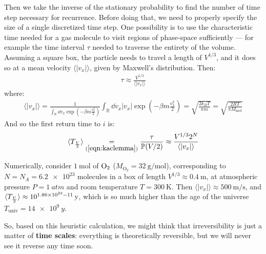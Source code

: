 \documentclass[../../main.tex]{subfiles}
\begin{document}
\medskip

Then we take the inverse of the stationary probability to find the number of time step necessary for recurrence. Before doing that, we need to properly specify the size of a single discretized time step. One possibility is to use the characteristic time needed for a gas molecule to visit regions of phase-space sufficiently  --- for example the time interval $\tau$ needed to traverse the entirety of the volume. Assuming a square box, the particle needs to travel a length of $V^{1/3}$, and it does so at a mean velocity $\langle |v_x| \rangle$, given by Maxwell's distribution. Then:
\begin{align*}
    \tau \approx \frac{V^{1/3}}{\langle |v_x| \rangle} 
\end{align*}
where:
\begin{align*}
    \langle |v_x| \rangle = \frac{1}{{\int_{\mathbb{R}} \dd{v_x} \exp\left(-\beta m \frac{v_x^2}{2} \right)}}  \int_{\mathbb{R}} \dd{v_x} |v_x| {\exp(-\beta m \frac{v_x^2}{2} )} = \sqrt{\frac{2 k_B T}{\pi m}} = \sqrt{\frac{2 R T}{\pi M_{\mathrm{mol}}} }
\end{align*}
And so the first return time to $i$ is:
\begin{align*}
    \langle T_{\frac{V}{2}} \rangle \underset{(\ref{eqn:kaclemma})}{=} \frac{\tau}{\mathbb{P}(V/2)} \approx \frac{V^{1/3} 2^N}{\langle |v_x| \rangle} 
\end{align*}

Numerically, consider $\SI{1}{\mol}$ of $\rm{O}_2$ ($M_{\mathrm{O}_2} = \SI{32}{\g\per\mol}$), corresponding to $N=N_A = \num{6.2e23}$ molecules in a box of length $V^{1/3} \approx \SI{0.4}{\m}$, at atmospheric pressure $P=\SI{1}{atm}$ and room temperature $T= \SI{300}{\K}$. Then $\langle |v_x| \rangle \approx \SI{500}{\m\per\s}$, and $\langle T_{\frac{V}{2}} \rangle \approx 10^{1.86 \times 10^{23}-11}\,\rm{y}$, which is so much higher than the age of the universe $T_{\mathrm{univ}} = \SI{14e9}{y}$.

\medskip

So, based on this heuristic calculation, we might think that irreversibility is just a matter of \textbf{time scales}: everything is theoretically reversible, but we will never see it reverse any time soon.
\end{document}
